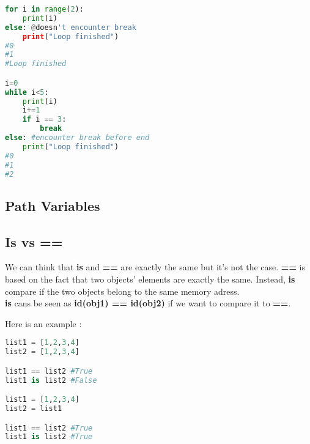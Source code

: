 \documentclass[a4paper, 12pt, titlepage]{scrartcl} %
\begin{document}
\begin{lstlisting}[language=Python]
for i in range(2):
    print(i)
else: @doesn't encounter break
    print("Loop finished")
#0
#1
#Loop finished

i=0
while i<5:
    print(i)
    i+=1
    if i == 3:
        break
else: #encounter break before end
    print("Loop finished")
#0
#1
#2
\end{lstlisting} \vspace{5mm}

\subsection{Path Variables}
\label{subsec:PathVariables}

\subsection{Is vs ==}
\label{subsec:Is}
We can think that \textbf{is} and \textbf{==} are exactly the same but it's not the case. \textbf{==} is based on the fact that two objects' elements are exactly the same. Instead, \textbf{is} compare if the two objects belong to the same memory adress.\\
\textbf{is} cans be seen as \textbf{id(obj1) == id(obj2)} if we want to compare it to \textbf{==}.

Here is an example :
\begin{lstlisting}[language=Python]
list1 = [1,2,3,4]
list2 = [1,2,3,4]

list1 == list2 #True
list1 is list2 #False

list1 = [1,2,3,4]
list2 = list1

list1 == list2 #True
list1 is list2 #True
\end{lstlisting} \vspace{5mm}
\end{document}
